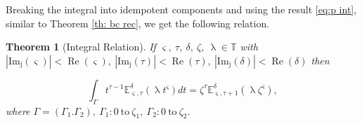 \documentclass[a4paper,12pt]{article}
\newtheorem{theorem}{Theorem}[section]
\theoremstyle{remark}
\begin{document}
\noindent Breaking the integral into idempotent components and using the result \eqref{eq:p int}, similar to  Theorem \ref{th: bc rec}, we get the following  relation. %
\begin{theorem}[Integral Relation]
	If $ \varsigma,~\tau,~\delta,~\zeta,~\uplambda \in\mathbb{T}$ with $|\operatorname{Im_j}( \varsigma)|<\operatorname{Re}( \varsigma),~|\operatorname{Im_j}(\tau)|<\operatorname{Re}(\tau),~|\operatorname{Im_j}(\delta)|<\operatorname{Re}(\delta)$ then
	
    \begin{equation}\label{eq:p int1}
	\int_{\Gamma}t^{\tau-1}\mathbb{E}^\delta_{ \varsigma,\tau}(\uplambda t^ \varsigma)dt=\zeta^{\tau}\mathbb{E}^\delta_{ \varsigma,\tau+1}(\uplambda  \zeta^ \varsigma),
    \end{equation}
where $\Gamma =(\Gamma_1.\Gamma_2) ,~\Gamma_1:0 ~\text{to}~ \zeta_1,~\Gamma_2:0 ~\text{to}~ \zeta_2.$ 
\end{theorem}

	
\end{document}
